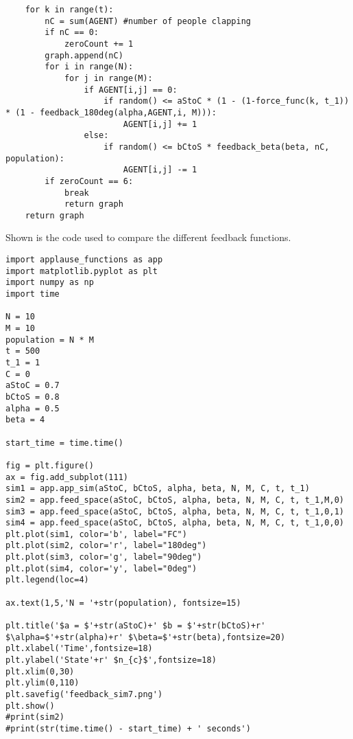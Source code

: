 \begin{lstlisting}
    for k in range(t):
        nC = sum(AGENT) #number of people clapping
        if nC == 0:
            zeroCount += 1
        graph.append(nC)
        for i in range(N):
            for j in range(M):
                if AGENT[i,j] == 0:
                    if random() <= aStoC * (1 - (1-force_func(k, t_1)) * (1 - feedback_180deg(alpha,AGENT,i, M))):
                        AGENT[i,j] += 1
                else:
                    if random() <= bCtoS * feedback_beta(beta, nC, population):
                        AGENT[i,j] -= 1
        if zeroCount == 6:
            break
            return graph
    return graph        
\end{lstlisting}

Shown is the code used to compare the different feedback functions.

\begin{lstlisting}
import applause_functions as app
import matplotlib.pyplot as plt
import numpy as np
import time

N = 10
M = 10
population = N * M
t = 500
t_1 = 1
C = 0
aStoC = 0.7
bCtoS = 0.8
alpha = 0.5
beta = 4

start_time = time.time()

fig = plt.figure()
ax = fig.add_subplot(111)
sim1 = app.app_sim(aStoC, bCtoS, alpha, beta, N, M, C, t, t_1)
sim2 = app.feed_space(aStoC, bCtoS, alpha, beta, N, M, C, t, t_1,M,0)
sim3 = app.feed_space(aStoC, bCtoS, alpha, beta, N, M, C, t, t_1,0,1)
sim4 = app.feed_space(aStoC, bCtoS, alpha, beta, N, M, C, t, t_1,0,0)
plt.plot(sim1, color='b', label="FC")
plt.plot(sim2, color='r', label="180deg")
plt.plot(sim3, color='g', label="90deg")
plt.plot(sim4, color='y', label="0deg")
plt.legend(loc=4)

ax.text(1,5,'N = '+str(population), fontsize=15)

plt.title('$a = $'+str(aStoC)+' $b = $'+str(bCtoS)+r' $\alpha=$'+str(alpha)+r' $\beta=$'+str(beta),fontsize=20)
plt.xlabel('Time',fontsize=18)
plt.ylabel('State'+r' $n_{c}$',fontsize=18)
plt.xlim(0,30)
plt.ylim(0,110)
plt.savefig('feedback_sim7.png')
plt.show()
#print(sim2)
#print(str(time.time() - start_time) + ' seconds')
\end{lstlisting} 
